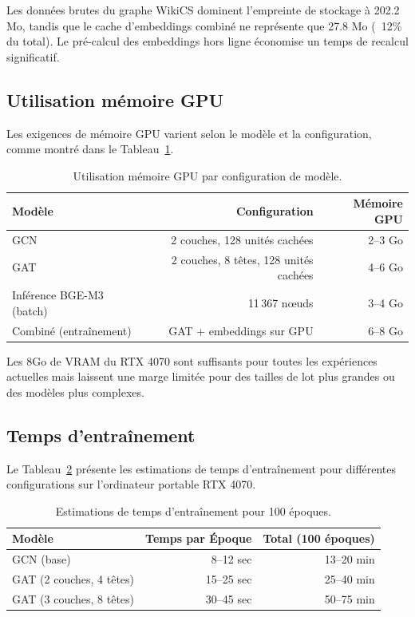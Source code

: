Les données brutes du graphe WikiCS dominent l'empreinte de stockage à 202.2 Mo, tandis que le cache d'embeddings combiné ne représente que 27.8 Mo (~12\% du total). Le pré-calcul des embeddings hors ligne économise un temps de recalcul significatif.

\subsection{Utilisation mémoire GPU}

Les exigences de mémoire GPU varient selon le modèle et la configuration, comme montré dans le Tableau~\ref{tab:gpu-memory}.

\begin{table}[htbp]
\centering
\caption{Utilisation mémoire GPU par configuration de modèle.}
\label{tab:gpu-memory}
\begin{tabular}{lrr}
\toprule
\textbf{Modèle} & \textbf{Configuration} & \textbf{Mémoire GPU} \\
\midrule
GCN & 2 couches, 128 unités cachées & 2--3 Go \\
GAT & 2 couches, 8 têtes, 128 unités cachées & 4--6 Go \\
Inférence BGE-M3 (batch) & 11\,367 nœuds & 3--4 Go \\
Combiné (entraînement) & GAT + embeddings sur GPU & 6--8 Go \\
\bottomrule
\end{tabular}
\end{table}

Les 8Go de VRAM du RTX 4070 sont suffisants pour toutes les expériences actuelles mais laissent une marge limitée pour des tailles de lot plus grandes ou des modèles plus complexes.

\subsection{Temps d'entraînement}

Le Tableau~\ref{tab:training-time} présente les estimations de temps d'entraînement pour différentes configurations sur l'ordinateur portable RTX 4070.

\begin{table}[htbp]
\centering
\caption{Estimations de temps d'entraînement pour 100 époques.}
\label{tab:training-time}
\begin{tabular}{lrr}
\toprule
\textbf{Modèle} & \textbf{Temps par Époque} & \textbf{Total (100 époques)} \\
\midrule
GCN (base) & 8--12 sec & 13--20 min \\
GAT (2 couches, 4 têtes) & 15--25 sec & 25--40 min \\
GAT (3 couches, 8 têtes) & 30--45 sec & 50--75 min \\
\bottomrule
\end{tabular}
\end{table}

